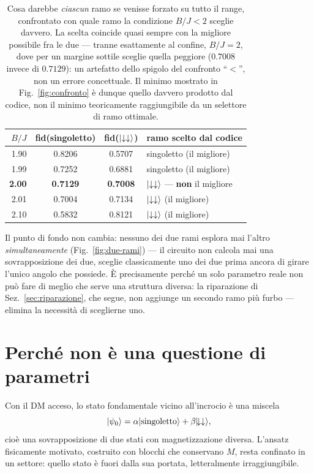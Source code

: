 \documentclass[11pt,a4paper]{article}
\begin{document}
\begin{table}[htbp]
\centering
\small
\renewcommand{\arraystretch}{1.25}
\begin{tabular}{@{}rccl@{}}
\toprule
\rowcolor{grigetto}
$B/J$ & fid(singoletto) & fid($\lvert \downarrow\downarrow\rangle$) & ramo scelto dal codice \\
\midrule
1.90 & 0.8206 & 0.5707 & singoletto (il migliore) \\
1.99 & 0.7252 & 0.6881 & singoletto (il migliore) \\
\textbf{2.00} & \textbf{0.7129} & \textbf{0.7008} & $\lvert \downarrow\downarrow\rangle$ --- \textbf{non} il migliore \\
2.01 & 0.7004 & 0.7134 & $\lvert \downarrow\downarrow\rangle$ (il migliore) \\
2.10 & 0.5832 & 0.8121 & $\lvert \downarrow\downarrow\rangle$ (il migliore) \\
\bottomrule
\end{tabular}
\caption{Cosa darebbe \emph{ciascun} ramo se venisse forzato su tutto il
range, confrontato con quale ramo la condizione $B/J<2$ sceglie davvero. La
scelta coincide quasi sempre con la migliore possibile fra le due --- tranne
esattamente al confine, $B/J=2$, dove per un margine sottile sceglie quella
peggiore ($0.7008$ invece di $0.7129$): un artefatto dello spigolo del
confronto ``$<$'', non un errore concettuale. Il minimo mostrato in
Fig.~\ref{fig:confronto} è dunque quello davvero prodotto dal codice, non il
minimo teoricamente raggiungibile da un selettore di ramo ottimale.}
\label{tab:doppio-ramo}
\end{table}

\FloatBarrier

Il punto di fondo non cambia: nessuno dei due rami esplora mai l'altro
\emph{simultaneamente} (Fig.~\ref{fig:due-rami}) --- il circuito non calcola
mai una sovrapposizione dei due, sceglie classicamente uno dei due prima
ancora di girare l'unico angolo che possiede. È precisamente perché un solo
parametro reale non può fare di meglio che serve una struttura diversa: la
riparazione di Sez.~\ref{sec:riparazione}, che segue, non aggiunge un secondo
ramo più furbo --- elimina la necessità di sceglierne uno.

\section{Perché non è una questione di parametri}

Con il DM acceso, lo stato fondamentale vicino all'incrocio è una miscela
\begin{equation}
\lvert \psi_0\rangle = \alpha\lvert \text{singoletto}\rangle + \beta\lvert \!\downarrow\downarrow\rangle,
\end{equation}
cioè una sovrapposizione di due stati con magnetizzazione diversa. L'ansatz
fisicamente motivato, costruito con blocchi che conservano $M$, resta confinato
in un settore: quello stato è fuori dalla sua portata, letteralmente
irraggiungibile.
\end{document}
